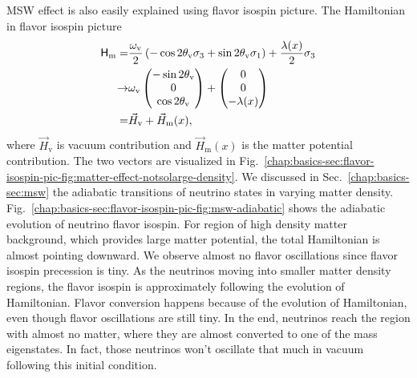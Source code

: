 MSW effect is also easily explained using flavor isospin picture. The Hamiltonian in flavor isospin picture
\begin{align*}
    \mathsf H_\mathrm m = & \frac{\omega_{\mathrm{v}}}{2}\left( - \cos 2\theta_{\mathrm{v}} {\sigma_3} + \sin 2\theta_{\mathrm{v}} {\sigma_1} \right)   + \frac{\lambda(x)}{2} {\sigma_3} \\
    \to &  \omega_{\mathrm v}\begin{pmatrix}
    - \sin 2\theta_{\mathrm v} \\
    0 \\
    \cos 2\theta_{\mathrm v}
    \end{pmatrix}   + \begin{pmatrix}
    0\\
    0\\
    - \lambda(x)
    \end{pmatrix}  \\
    = &  \vec H_{\mathrm v} + \vec H_{\mathrm m}(x),
\end{align*}
where $\vec H_{\mathrm v}$ is vacuum contribution and $\vec H_{\mathrm m}(x)$ is the matter potential contribution. The two vectors are visualized in Fig.~\ref{chap:basics-sec:flavor-isospin-pic-fig:matter-effect-notsolarge-density}. We discussed in Sec.~\ref{chap:basics-sec:msw} the adiabatic transitions of neutrino states in varying matter density. Fig.~\ref{chap:basics-sec:flavor-isospin-pic-fig:msw-adiabatic} shows the adiabatic evolution of neutrino flavor isospin. For region of high density matter background, which provides large matter potential, the total Hamiltonian is almost pointing downward. We observe almost no flavor oscillations since flavor isospin precession is tiny. As the neutrinos moving into smaller matter density regions, the flavor isospin is approximately following the evolution of Hamiltonian. Flavor conversion happens because of the evolution of Hamiltonian, even though flavor oscillations are still tiny. In the end, neutrinos reach the region with almost no matter, where they are almost converted to one of the mass eigenstates. In fact, those neutrinos won't oscillate that much in vacuum following this initial condition.






